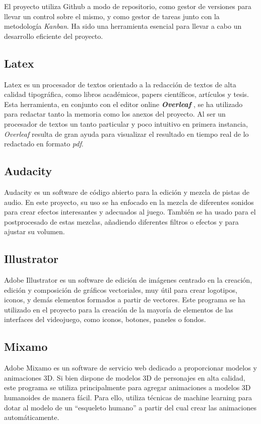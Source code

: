 El proyecto utiliza Github a modo de repositorio, como gestor de versiones para llevar un control sobre el mismo, y como gestor de tareas junto con la metodología \textit{Kanban}. Ha sido una herramienta esencial para llevar a cabo un desarrollo eficiente del proyecto.

\subsection{Latex}
Latex \cite{wiki:Latex} es un procesador de textos orientado a la redacción de textos de alta calidad tipográfica, como libros académicos, papers científicos, artículos y tesis. Esta herramienta, en conjunto con el editor online \textbf{\textit{Overleaf}} \cite{wiki:Overleaf}, se ha utilizado para redactar tanto la memoria como los anexos del proyecto. Al ser un procesador de textos un tanto particular y poco intuitivo en primera instancia, \textit{Overleaf} resulta de gran ayuda para visualizar el resultado en tiempo real de lo redactado en formato \textit{pdf}.

\subsection{Audacity}
Audacity \cite{wiki:Audacity} es un software de código abierto para la edición y mezcla de pistas de audio. En este proyecto, su uso se ha enfocado en la mezcla de diferentes sonidos para crear efectos interesantes y adecuados al juego. También se ha usado para el postprocesado de estas mezclas, añadiendo diferentes filtros o efectos y para ajustar su volumen.

\subsection{Illustrator}
Adobe Illustrator \cite{wiki:Illustrator} es un software de edición de imágenes centrado en la creación, edición y composición de gráficos vectoriales, muy útil para crear logotipos, iconos, y demás elementos formados a partir de vectores.
Este programa se ha utilizado en el proyecto para la creación de la mayoría de elementos de las interfaces del videojuego, como iconos, botones, paneles o fondos.

\subsection{Mixamo}
Adobe Mixamo \cite{wiki:Mixamo} es un software de servicio web dedicado a proporcionar modelos y animaciones 3D. Si bien dispone de modelos 3D de personajes en alta calidad, este programa se utiliza principalmente para agregar animaciones a modelos 3D humanoides de manera fácil. Para ello, utiliza técnicas de machine learning para dotar al modelo de un “esqueleto humano” a partir del cual crear las animaciones automáticamente.

